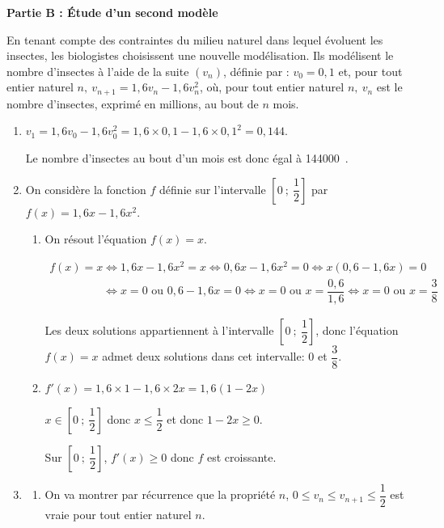 \documentclass[10pt]{article}
\providecommand{\np}[2][]{{#2~#1}}
\begin{document}
\bigskip

\textbf{Partie B : Étude d'un second modèle}

\medskip

En tenant compte des contraintes du milieu naturel dans lequel évoluent les insectes, les biologistes choisissent une nouvelle modélisation.
Ils modélisent le nombre d'insectes à l'aide de la suite $\left(v_n\right)$, définie par :
$v_0 = 0,1$  et, pour tout entier naturel $n,\: v_{n+1} = 1,6v_n - 1,6v_n^2$,
où, pour tout entier naturel $n,\: v_n$ est le nombre d'insectes, exprimé en millions, au bout de $n$ mois.

\medskip

\begin{enumerate}
\item $v_1=1,6v_0 - 1,6 v_0^2 = 1,6\times 0,1 - 1,6\times 0,1^2 = 0,144$.

Le nombre d'insectes au bout d'un mois est donc égal à \np{144000}.

\item On considère la fonction $f$ définie sur l'intervalle $\left[0~;~\dfrac12\right]$ par
$f(x) = 1,6x - 1,6x^2$.

	\begin{enumerate}
		\item On résout l'équation $f(x) = x$.

$\begin{gathered}f(x)=x
\iff
1,6x-1,6x^2=x
\iff
0,6x - 1,6x^2=0
\iff
x\left (0,6-1,6x\right )=0\\
\phantom{f(x)=x}
\iff
x=0 \text{ ou }	0,6-1,6x=0
\iff
x=0 \text{ ou } x=\dfrac{0,6}{1,6}
\iff
x=0 \text{ ou } x=\dfrac{3}{8}\end{gathered}$

Les deux solutions appartiennent à l'intervalle $\left[0~;~\dfrac12\right]$, donc l'équation $f(x)=x$ admet deux solutions dans cet intervalle: 0 et $\dfrac{3}{8}$.
		
		\item 
$f'(x)=1,6\times 1 - 1,6\times 2x = 1,6\left (1-2x\right )$

$x\in\left[0~;~\dfrac12\right]$ donc $x\leqslant \dfrac{1}{2}$ et donc $1-2x\geqslant 0$.

Sur $\left[0~;~\dfrac12\right]$, $f'(x)\geqslant 0$ donc $f$ est croissante.
			\end{enumerate}
\item 
	\begin{enumerate}
		\item On va montrer par récurrence que la propriété $n$, $0 \leqslant v_n  \leqslant  v_{n+1} \leqslant  \dfrac12$ est vraie pour tout entier naturel $n$.
		

\end{enumerate}
\end{enumerate}
\end{document}

